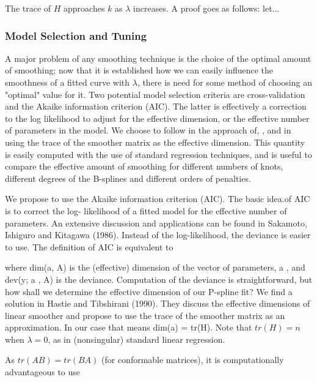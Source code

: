 \documentclass[12pt]{article}
\newcommand*\needsparaphrased{\color{red}}
\newcommand*\outlineskeleton{\color{green}}
\begin{document}
{\needsparaphrased The trace of $H$ approaches $k$ as $\lambda$ increases. A proof goes as follows: let...}

\subsubsection{{\outlineskeleton Model Selection and Tuning}}

A major problem of any smoothing technique is the choice of the optimal amount of smoothing; now that it is established how we can easily influence the smoothness of a fitted curve with $\lambda$, there is need for some method of choosing an "optimal" value for it. Two potential model selection criteria are cross-validation and the Akaike information criterion (AIC). The latter is effectively a correction to the log likelihood to adjust for the effective dimension, or the effective number of parameters in the model. We choose to follow in the approach of\cite{eilers1996flexible}, \cite{marx2005multidimensional}, and \cite{buja1989linear} in using the trace of the smoother matrix as the effective dimension. This quantity is easily computed with the use of standard regression techniques, and is useful to compare the effective amount of smoothing for different numbers of knots, different degrees of the B-splines and different orders of penalties.

{\needsparaphrased  We propose to use the Akaike information criterion (AIC). The basic idea.of AIC is to correct the log- likelihood of a fitted model for the effective number of parameters. An extensive discussion and applications can be found in Sakamoto, Ishiguro and Kitagawa (1986). Instead of the log-likelihood, the deviance is easier to use. The definition of AIC is equivalent to}

{\needsparaphrased where dim(a, A) is the (effective) dimension of the vector of parameters, a , and dev(y; a , A) is the deviance.
Computation of the deviance is straightforward, but how shall we determine the effective dimension of our P-spline fit? We find a solution in Hastie and Tibshirani (1990). They discuss the effective dimensions of linear smoother and propose to use the trace of the smoother matrix as an approximation. In our case that means dim(a) = tr(H). Note that $tr\left(H\right) = n$ when $\lambda = 0$, as in (nonsingular) standard linear regression. 

As $tr\left(AB\right) = tr\left(BA\right)$ (for conformable matrices), it is computationally advantageous to use}
\end{document}
